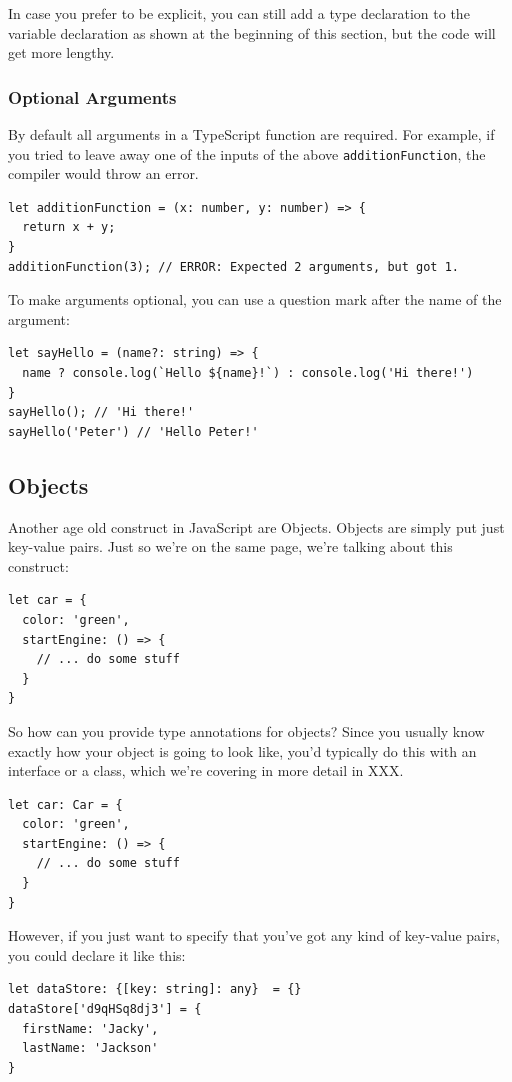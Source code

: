 \documentclass[12pt,a4paper]{report}
\newcommand{\code}[1]{\fbox{\texttt{#1}}}
\begin{document}
In case you prefer to be explicit, you can still add a type declaration to the variable declaration as shown at the beginning of this section, but the code will get more lengthy.

\subsubsection{Optional Arguments}
By default all arguments in a TypeScript function are required. For example, if you tried to leave away one of the inputs of the above \texttt{additionFunction}, the compiler would throw an error.
\begin{lstlisting}
let additionFunction = (x: number, y: number) => {
  return x + y;
}
additionFunction(3); // ERROR: Expected 2 arguments, but got 1.
\end{lstlisting}
To make arguments optional, you can use a question mark \code{?} after the name of the argument:
\begin{lstlisting}
let sayHello = (name?: string) => {
  name ? console.log(`Hello ${name}!`) : console.log('Hi there!')
}
sayHello(); // 'Hi there!'
sayHello('Peter') // 'Hello Peter!'
\end{lstlisting}

\subsection{Objects}
Another age old construct in JavaScript are Objects. Objects are simply put just key-value pairs. Just so we're on the same page, we're talking about this construct:
\begin{lstlisting}
let car = {
  color: 'green',
  startEngine: () => {
    // ... do some stuff
  }
}
\end{lstlisting}

So how can you provide type annotations for objects? Since you usually know exactly how your object is going to look like, you'd typically do this with an interface or a class, which we're covering in more detail in XXX.
\begin{lstlisting}
let car: Car = {
  color: 'green',
  startEngine: () => {
    // ... do some stuff
  }
}
\end{lstlisting}

However, if you just want to specify that you've got any kind of key-value pairs, you could declare it like this:
\begin{lstlisting}
let dataStore: {[key: string]: any}  = {}
dataStore['d9qHSq8dj3'] = {
  firstName: 'Jacky',
  lastName: 'Jackson'
}
\end{lstlisting}
\end{document}
